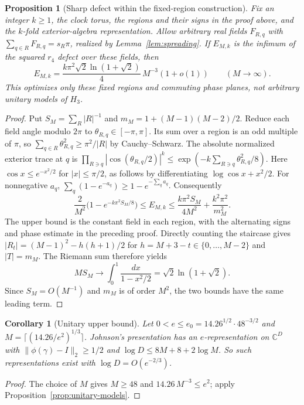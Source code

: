 \documentclass[11pt,a4paper]{article}
\theoremstyle{plain}
\newtheorem{proposition}[theorem]{Proposition}
\newtheorem{corollary}[theorem]{Corollary}
\theoremstyle{definition}
\theoremstyle{remark}
\begin{document}
\begin{proposition}[Sharp defect within the fixed-region construction]\label{prop:restricted-flux}
Fix an integer $k\ge1$, the clock torus, the regions and their signs in the proof above, and the $k$-fold exterior-algebra representation.
Allow arbitrary real fields $F_{R,q}$ with $\sum_{q\in R}F_{R,q}=s_R\pi$, realized by Lemma~\ref{lem:spreading}.
If $E_{M,k}$ is the infimum of the squared $r_4$ defect over these fields, then
\[
E_{M,k}=\frac{k\pi^2\sqrt2\ln(1+\sqrt2)}4\,M^{-3}(1+o(1))\qquad(M\to\infty).
\]
This optimizes only these fixed regions and commuting phase planes, not arbitrary unitary models of $H_3$.
\end{proposition}
\begin{proof}
Put $S_M=\sum_R|R|^{-1}$ and $m_M=1+(M-1)(M-2)/2$. Reduce each field angle modulo $2\pi$ to
$\theta_{R,q}\in[-\pi,\pi]$. Its sum over a region is an odd multiple of $\pi$, so
$\sum_{q\in R}\theta_{R,q}^2\ge\pi^2/|R|$ by Cauchy--Schwarz.
The absolute normalized exterior trace at $q$ is
$\prod_{R\ni q}|\cos(\theta_{R,q}/2)|^k\le\exp(-k\sum_{R\ni q}\theta_{R,q}^2/8)$.
Here $\cos x\le e^{-x^2/2}$ for $|x|\le\pi/2$, as follows by differentiating $\log\cos x+x^2/2$.
For nonnegative $a_q$, $\sum_q(1-e^{-a_q})\ge1-e^{-\sum_q a_q}$. Consequently
\[
\frac2{M^2}\bigl(1-e^{-k\pi^2S_M/8}\bigr)\le E_{M,k}
\le\frac{k\pi^2S_M}{4M^2}+\frac{k^2\pi^2}{m_M^2}.
\]
The upper bound is the constant field in each region, with the alternating signs and phase estimate in the preceding proof.
Directly counting the staircase gives
$|R_t|=(M-1)^2-h(h+1)/2$ for $h=M+3-t\in\{0,\ldots,M-2\}$ and $|T|=m_M$.
The Riemann sum therefore yields
\[
MS_M\longrightarrow\int_0^1\frac{dx}{1-x^2/2}=\sqrt2\ln(1+\sqrt2).
\]
Since $S_M=O(M^{-1})$ and $m_M$ is of order $M^2$, the two bounds have the same leading term.
\end{proof}

\begin{corollary}[Unitary upper bound]\label{cor:unitary-upper}
Let $0<e\le e_0=14.26^{1/2}\cdot48^{-3/2}$ and $M=\lceil(14.26/e^2)^{1/3}\rceil$. Johnson's presentation has an $e$-representation on $\mathbb C^D$ with
$\|\phi(\gamma)-I\|_2\ge1/2$ and $\log D\le8M+8+2\log M$. So such representations exist with $\log D=O(e^{-2/3})$.
\end{corollary}

\begin{proof}
The choice of $M$ gives $M\ge48$ and $14.26\,M^{-3}\le e^2$; apply Proposition~\ref{prop:unitary-models}.
\end{proof}
\end{document}
